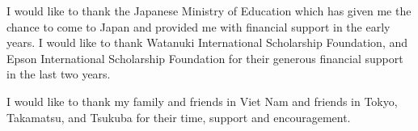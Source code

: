 \documentclass[a4paper,11pt]{report}
\begin{document}
I would like to thank the Japanese Ministry of Education which has given me the chance to come to Japan and provided me with ﬁnancial support in the early years. I would like to thank Watanuki International Scholarship Foundation, and Epson International Scholarship Foundation for their generous financial support in the last two years.

I would like to thank my family and friends in Viet Nam and friends in Tokyo, Takamatsu, and Tsukuba for their time, support and encouragement.

\newpage

\appendix %







\renewcommand{\bibname}{Bibliography}

%

\end{document}
